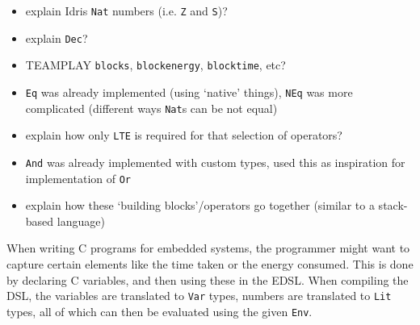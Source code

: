 \begin{itemize}
	\item explain Idris \texttt{Nat} numbers (i.e. \texttt{Z} and \texttt{S})?
	\item explain \texttt{Dec}?
	\item TEAMPLAY \texttt{blocks}, \texttt{blockenergy}, \texttt{blocktime},
		  etc?
	\item \texttt{Eq} was already implemented (using `native' things),
		  \texttt{NEq} was more complicated (different ways \texttt{Nat}s can be
		  not equal)
	\item explain how only \texttt{LTE} is required for that selection of
		  operators?
	\item \texttt{And} was already implemented with custom types, used this as
		  inspiration for implementation of \texttt{Or}
	\item explain how these `building blocks'/operators go together (similar to
		  a stack-based language)
\end{itemize}

When writing C programs for embedded systems, the programmer might want to capture certain elements like the time taken or the energy consumed. This is done by declaring C variables, and then using these in the EDSL. When compiling the DSL, the variables are translated to \texttt{Var} types, numbers are translated to \texttt{Lit} types, all of which can then be evaluated using the given \texttt{Env}.
